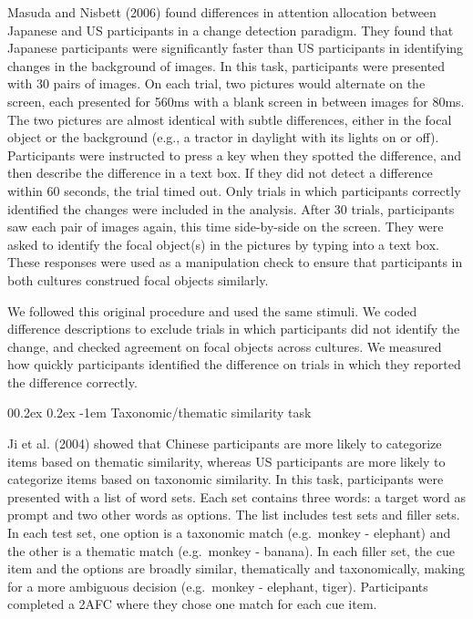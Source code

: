 \documentclass[
  man]{apa6}
\makeatletter
\let\oldparagraph\paragraph
\renewcommand{\paragraph}[1]{\oldparagraph{#1}\mbox{}}
\renewcommand{\paragraph}{\@startsection{paragraph}{4}{\parindent}%
  {0\baselineskip \@plus 0.2ex \@minus 0.2ex}%
  {-1em}%
  {\normalfont\normalsize\bfseries\itshape\typesectitle}}
\makeatother
\begin{document}
Masuda and Nisbett (2006) found differences in attention allocation between Japanese and US participants in a change detection paradigm. They found that Japanese participants were significantly faster than US participants in identifying changes in the background of images. In this task, participants were presented with 30 pairs of images. On each trial, two pictures would alternate on the screen, each presented for 560ms with a blank screen in between images for 80ms. The two pictures are almost identical with subtle differences, either in the focal object or the background (e.g., a tractor in daylight with its lights on or off). Participants were instructed to press a key when they spotted the difference, and then describe the difference in a text box. If they did not detect a difference within 60 seconds, the trial timed out. Only trials in which participants correctly identified the changes were included in the analysis. After 30 trials, participants saw each pair of images again, this time side-by-side on the screen. They were asked to identify the focal object(s) in the pictures by typing into a text box. These responses were used as a manipulation check to ensure that participants in both cultures construed focal objects similarly.

We followed this original procedure and used the same stimuli. We coded difference descriptions to exclude trials in which participants did not identify the change, and checked agreement on focal objects across cultures. We measured how quickly participants identified the difference on trials in which they reported the difference correctly.

\hypertarget{taxonomicthematic-similarity-task}{%
\paragraph{Taxonomic/thematic similarity task}\label{taxonomicthematic-similarity-task}}

Ji et al. (2004) showed that Chinese participants are more likely to categorize items based on thematic similarity, whereas US participants are more likely to categorize items based on taxonomic similarity. In this task, participants were presented with a list of word sets. Each set contains three words: a target word as prompt and two other words as options. The list includes test sets and filler sets. In each test set, one option is a taxonomic match (e.g.~monkey - elephant) and the other is a thematic match (e.g.~monkey - banana). In each filler set, the cue item and the options are broadly similar, thematically and taxonomically, making for a more ambiguous decision (e.g.~monkey - elephant, tiger). Participants completed a 2AFC where they chose one match for each cue item.
\end{document}
